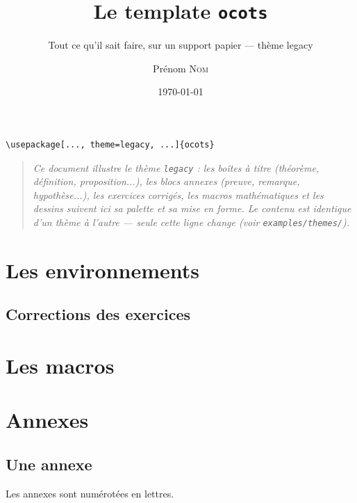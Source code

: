 \documentclass[11pt,twoside]{ocots-book}
\title{Le template \texttt{ocots}}
\subtitle{Tout ce qu'il sait faire, sur un support papier --- thème legacy}
\author{Prénom \textsc{Nom}}
\date{\today}
\begin{document}
\dominitoc%

\frontmatter%
\maketitle

\begin{lstlisting}
\usepackage[..., theme=legacy, ...]{ocots}
\end{lstlisting}
\begin{quote}\itshape
Ce document illustre le th\`eme \texttt{legacy} : les bo\^ites \`a titre
(th\'eor\`eme, d\'efinition, proposition...), les blocs annexes (preuve,
remarque, hypoth\`ese...), les exercices corrig\'es, les macros
math\'ematiques et les dessins suivent ici sa palette et sa mise en forme.
Le contenu est identique d'un th\`eme \`a l'autre --- seule cette ligne
change (voir \texttt{examples/themes/}).
\end{quote}

\tableofcontents

\mainmatter%

\part{Les environnements}%
\label{part:env}

\ocotscollectsolutions%





\chapter{Corrections des exercices}%
\label{chap:solutions}
\ocotsprintsolutions%

\part{Les macros}%
\label{part:macros}




\part{Annexes}%
\label{part:appendix}

\begin{appendix}
    \chapter{Une annexe}%
    \label{chap:appendix}
    \minitoc%

    Les annexes sont numérotées en lettres.
\end{appendix}

\backmatter%
\printindex%
\end{document}
